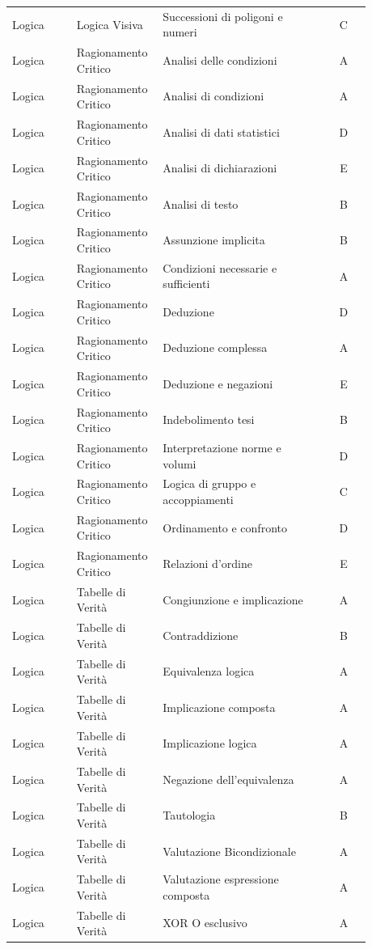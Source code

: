 \documentclass[20pt, a4paper]{article}
\begin{document}
\begin{longtable}{@{}>{\raggedright\arraybackslash}p{0.18\linewidth}>{\raggedright\arraybackslash}p{0.24\linewidth}>{\raggedright\arraybackslash}p{0.46\linewidth}c@{}}
Logica & Logica Visiva & Successioni di poligoni e numeri & C \\
Logica & Ragionamento Critico & Analisi delle condizioni & A \\
Logica & Ragionamento Critico & Analisi di condizioni & A \\
Logica & Ragionamento Critico & Analisi di dati statistici & D \\
Logica & Ragionamento Critico & Analisi di dichiarazioni & E \\
Logica & Ragionamento Critico & Analisi di testo & B \\
Logica & Ragionamento Critico & Assunzione implicita & B \\
Logica & Ragionamento Critico & Condizioni necessarie e sufficienti & A \\
Logica & Ragionamento Critico & Deduzione & D \\
Logica & Ragionamento Critico & Deduzione complessa & A \\
Logica & Ragionamento Critico & Deduzione e negazioni & E \\
Logica & Ragionamento Critico & Indebolimento tesi & B \\
Logica & Ragionamento Critico & Interpretazione norme e volumi & D \\
Logica & Ragionamento Critico & Logica di gruppo e accoppiamenti & C \\
Logica & Ragionamento Critico & Ordinamento e confronto & D \\
Logica & Ragionamento Critico & Relazioni d'ordine & E \\
Logica & Tabelle di Verità & Congiunzione e implicazione & A \\
Logica & Tabelle di Verità & Contraddizione & B \\
Logica & Tabelle di Verità & Equivalenza logica & A \\
Logica & Tabelle di Verità & Implicazione composta & A \\
Logica & Tabelle di Verità & Implicazione logica & A \\
Logica & Tabelle di Verità & Negazione dell'equivalenza & A \\
Logica & Tabelle di Verità & Tautologia & B \\
Logica & Tabelle di Verità & Valutazione Bicondizionale & A \\
Logica & Tabelle di Verità & Valutazione espressione composta & A \\
Logica & Tabelle di Verità & XOR O esclusivo & A \\

\end{longtable}
\end{document}
